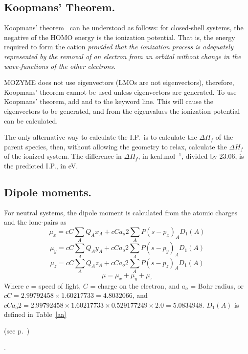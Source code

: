 \subsection{Koopmans' Theorem.}
Koopmans' theorem~\cite{koopmans} can be understood as follows:  for
closed-shell systems, the negative of the HOMO energy is the ionization
potential. That is, the energy required to form the cation {\em provided that
the ionization process is adequately represented by the removal of an electron
from an orbital without change in the wave-functions of the other electrons.}

MOZYME does not use  eigenvectors (LMOs are not eigenvectors), therefore,
Koopmans' theorem cannot be used unless eigenvectors are generated.  To use
Koopmans' theorem, add  and  to the keyword line.
This will cause the eigenvectors to be generated, and from the eigenvalues the
ionization potential can be calculated.

The only alternative way to calculate the I.P.\ is to calculate the $\Delta
H_f$ of the parent species, then, without allowing the geometry to relax,
calculate the $\Delta H_f$ of the ionized system.  The difference in  $\Delta
H_f$, in kcal.mol$^{-1}$, divided by 23.06, is the predicted I.P., in eV.

\subsection{Dipole moments.}
For neutral systems, the dipole moment is calculated from the atomic charges
and the lone-pairs as
\begin{equation}
\mu_x  = cC\sum_AQ_Ax_A + cCa_o2\sum_A P(s-p_x)_AD_1(A)
\end  {equation}
\begin{equation}
\mu_y  = cC\sum_AQ_Ay_A + cCa_o2\sum_A P(s-p_y)_AD_1(A)
\end  {equation}
\begin{equation}
\mu_z  = cC\sum_AQ_Az_A + cCa_o2\sum_A P(s-p_z)_AD_1(A)
\end  {equation}
\begin{equation}
\mu = \mu_x+\mu_y+\mu_z
\end  {equation}
Where $c$ = speed of light, $C$ = charge on the electron, and $a_o$ = Bohr
radius, or $cC = 2.99792458 \times 1.60217733 = 4.8032066$, and $cCa_o2 = 
2.99792458 \times 1.60217733 \times 0.529177249 \times 2.0  = 5.0834948$.  $D_1(A)$ is defined  in
Table~\ref{aa}
\begin{latexonly}
(see p.~\pageref{aa})
\end{latexonly}.

